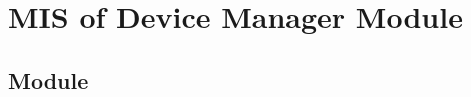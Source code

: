 \documentclass[12pt, titlepage]{article}
\begin{document}
%
%
%
%
%
%
%
%
%
%





\section{MIS of Device Manager Module} \label{mDM} 

\subsection{Module}
\end{document}
